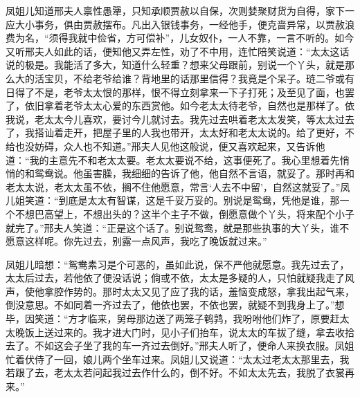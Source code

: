 凤姐儿知道邢夫人禀性愚犟，只知承顺贾赦以自保，次则婪聚财货为自得，家下一应大小事务，俱由贾赦摆布。凡出入银钱事务，一经他手，便克啬异常，以贾赦浪费为名，“须得我就中俭省，方可偿补”，儿女奴仆，一人不靠，一言不听的。如今又听邢夫人如此的话，便知他又弄左性，劝了不中用，连忙陪笑说道：“太太这话说的极是。我能活了多大，知道什么轻重？想来父母跟前，别说一个丫头，就是那么大的活宝贝，不给老爷给谁？背地里的话那里信得？我竟是个呆子。琏二爷或有日得了不是，老爷太太恨的那样，恨不得立刻拿来一下子打死；及至见了面，也罢了，依旧拿着老爷太太心爱的东西赏他。如今老太太待老爷，自然也是那样了。依我说，老太太今儿喜欢，要讨今儿就讨去。我先过去哄着老太太发笑，等太太过去了，我搭讪着走开，把屋子里的人我也带开，太太好和老太太说的。给了更好，不给也没妨碍，众人也不知道。”邢夫人见他这般说，便又喜欢起来，又告诉他道：“我的主意先不和老太太要。老太太要说不给，这事便死了。我心里想着先悄悄的和鸳鸯说。他虽害臊，我细细的告诉了他，他自然不言语，就妥了。那时再和老太太说，老太太虽不依，搁不住他愿意，常言‘人去不中留’，自然这就妥了。”凤儿姐笑道：“到底是太太有智谋，这是千妥万妥的。别说是鸳鸯，凭他是谁，那一个不想巴高望上，不想出头的？这半个主子不做，倒愿意做个丫头，将来配个小子就完了。”邢夫人笑道：“正是这个话了。别说鸳鸯，就是那些执事的大丫头，谁不愿意这样呢。你先过去，别露一点风声，我吃了晚饭就过来。”

凤姐儿暗想：“鸳鸯素习是个可恶的，虽如此说，保不严他就愿意。我先过去了，太太后过去，若他依了便没话说；倘或不依，太太是多疑的人，只怕就疑我走了风声，使他拿腔作势的。那时太太又见了应了我的话，羞恼变成怒，拿我出起气来，倒没意思。不如同着一齐过去了，他依也罢，不依也罢，就疑不到我身上了。”想毕，因笑道：“方才临来，舅母那边送了两笼子鹌鹑，我吩咐他们炸了，原要赶太太晚饭上送过来的。我才进大门时，见小子们抬车，说太太的车拔了缝，拿去收拾去了。不如这会子坐了我的车一齐过去倒好。”邢夫人听了，便命人来换衣服。凤姐忙着伏侍了一回，娘儿两个坐车过来。凤姐儿又说道：“太太过老太太那里去，我若跟了去，老太太若问起我过去作什么的，倒不好。不如太太先去，我脱了衣裳再来。”

